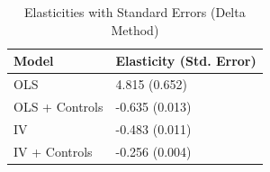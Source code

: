 \begin{table}

\caption{Elasticities with Standard Errors (Delta Method)}
\centering
\begin{tabular}[t]{ll}
\toprule
Model & Elasticity (Std. Error)\\
\midrule
OLS & 4.815 (0.652)\\
OLS + Controls & -0.635 (0.013)\\
IV & -0.483 (0.011)\\
IV + Controls & -0.256 (0.004)\\
\bottomrule
\end{tabular}
\end{table}